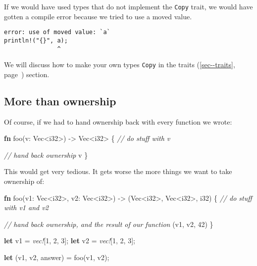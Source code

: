 \documentclass[a4paper,]{book}
\renewcommand*{\hyperref}[2][\ar]{%
  \def\ar{#2}%
  #2 (\autoref{#1}, page~\pageref{#1})}
\newenvironment{Shaded}{\begin{snugshade}}{\end{snugshade}}
\newcommand{\KeywordTok}[1]{\textcolor[rgb]{0.13,0.29,0.53}{\textbf{{#1}}}}
\newcommand{\DataTypeTok}[1]{\textcolor[rgb]{0.13,0.29,0.53}{{#1}}}
\newcommand{\DecValTok}[1]{\textcolor[rgb]{0.00,0.00,0.81}{{#1}}}
\newcommand{\CommentTok}[1]{\textcolor[rgb]{0.56,0.35,0.01}{\textit{{#1}}}}
\newcommand{\PreprocessorTok}[1]{\textcolor[rgb]{0.56,0.35,0.01}{\textit{{#1}}}}
\newcommand{\NormalTok}[1]{{#1}}
\begin{document}
If we would have used types that do not implement the \texttt{Copy}
trait, we would have gotten a compile error because we tried to use a
moved value.

\begin{verbatim}
error: use of moved value: `a`
println!("{}", a);
               ^
\end{verbatim}

We will discuss how to make your own types \texttt{Copy} in the
\hyperref[sec--traits]{traits} section.

\subsection{More than ownership}\label{more-than-ownership}

Of course, if we had to hand ownership back with every function we
wrote:

\begin{Shaded}
\begin{Highlighting}[]
\KeywordTok{fn} \NormalTok{foo(v: }\DataTypeTok{Vec}\NormalTok{<}\DataTypeTok{i32}\NormalTok{>) -> }\DataTypeTok{Vec}\NormalTok{<}\DataTypeTok{i32}\NormalTok{> \{}
    \CommentTok{// do stuff with v}

    \CommentTok{// hand back ownership}
    \NormalTok{v}
\NormalTok{\}}
\end{Highlighting}
\end{Shaded}

This would get very tedious. It gets worse the more things we want to
take ownership of:

\begin{Shaded}
\begin{Highlighting}[]
\KeywordTok{fn} \NormalTok{foo(v1: }\DataTypeTok{Vec}\NormalTok{<}\DataTypeTok{i32}\NormalTok{>, v2: }\DataTypeTok{Vec}\NormalTok{<}\DataTypeTok{i32}\NormalTok{>) -> (}\DataTypeTok{Vec}\NormalTok{<}\DataTypeTok{i32}\NormalTok{>, }\DataTypeTok{Vec}\NormalTok{<}\DataTypeTok{i32}\NormalTok{>, }\DataTypeTok{i32}\NormalTok{) \{}
    \CommentTok{// do stuff with v1 and v2}

    \CommentTok{// hand back ownership, and the result of our function}
    \NormalTok{(v1, v2, }\DecValTok{42}\NormalTok{)}
\NormalTok{\}}

\KeywordTok{let} \NormalTok{v1 = }\PreprocessorTok{vec!}\NormalTok{[}\DecValTok{1}\NormalTok{, }\DecValTok{2}\NormalTok{, }\DecValTok{3}\NormalTok{];}
\KeywordTok{let} \NormalTok{v2 = }\PreprocessorTok{vec!}\NormalTok{[}\DecValTok{1}\NormalTok{, }\DecValTok{2}\NormalTok{, }\DecValTok{3}\NormalTok{];}

\KeywordTok{let} \NormalTok{(v1, v2, answer) = foo(v1, v2);}
\end{Highlighting}
\end{Shaded}
\end{document}
